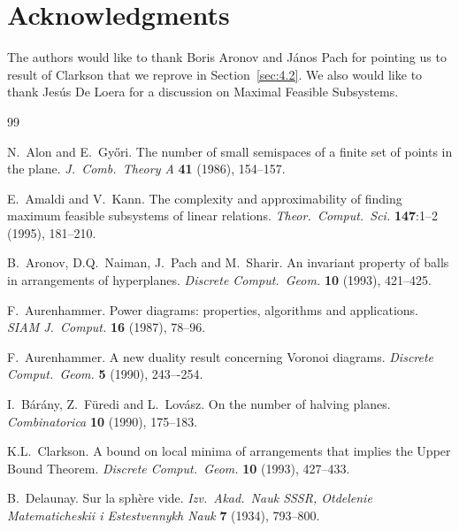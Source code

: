 \documentclass[10pt,a4paper]{article}
\theoremstyle{plain}
\begin{document}
\section*{Acknowledgments}
The authors would like to thank Boris Aronov and J\'anos Pach for pointing us to result of Clarkson that we reprove in Section~\ref{sec:4.2}. We also would like to thank Jes\'us De Loera for a discussion on Maximal Feasible Subsystems. 

\begin{thebibliography}{99}

{\sc N.\ Alon and E.\ Gy\H{o}ri.}
The number of small semispaces of a finite set of points in the plane.
\emph{J.\ Comb.\ Theory A} {\bf 41} (1986), 154--157.


{\sc E.\ Amaldi and V.\ Kann.}
The complexity and approximability of finding maximum feasible subsystems of linear relations.
\emph{Theor.\ Comput.\ Sci.} {\bf 147}:1--2 (1995), 181--210.


{\sc B.\ Aronov, D.Q.\ Naiman, J.\ Pach and M.\ Sharir.}
An invariant property of balls in arrangements of hyperplanes.
\emph{Discrete Comput.\ Geom.} {\bf 10} (1993), 421--425.

{\sc F.\ Aurenhammer.}
Power diagrams: properties, algorithms and applications.
\emph{SIAM J.\ Comput.} {\bf 16} (1987), 78--96.

{\sc F.\ Aurenhammer.}
A new duality result concerning Voronoi diagrams. 
\emph{Discrete Comput.\ Geom.} {\bf 5} (1990), 243–-254.

{\sc I.\ B\'ar\'any, Z.\ F\"uredi and L.\ Lov\'asz.}
On the number of halving planes. 
\emph{Combinatorica} {\bf 10} (1990), 175--183.

{\sc K.L.\ Clarkson.}
A bound on local minima of arrangements that implies the Upper Bound Theorem.
\emph{Discrete Comput.\ Geom.} {\bf 10} (1993), 427--433.

{\sc B.\ Delaunay.}
Sur la sph\`{e}re vide.
\emph{Izv.\ Akad.\ Nauk SSSR, Otdelenie Matematicheskii i Estestvennykh Nauk} {\bf 7} (1934), 793--800.


\end{thebibliography}
\end{document}
